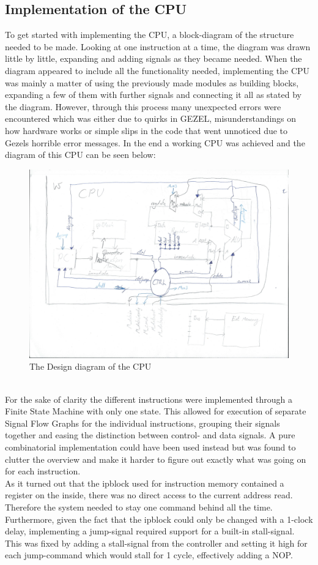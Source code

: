 \documentclass[12pt,a4paper]{article}
\begin{document}
\subsection{Implementation of the CPU}
	To get started with implementing the CPU, a block-diagram of the structure needed to be made. Looking at one instruction at a time, the diagram was drawn little by little, expanding and adding signals as they became needed. When the diagram appeared to include all the functionality needed, implementing the CPU was mainly a matter of using the previously made modules as building blocks, expanding a few of them with further signals and connecting it all as stated by the diagram. However, through this process many unexpected errors were encountered which was either due to quirks in GEZEL, misunderstandings on how hardware works or simple slips in the code that went unnoticed due to Gezels horrible error messages. In the end a working CPU was achieved and the diagram of this CPU can be seen below:\\
	\begin{figure}[h!]
		\centering
			\includegraphics[width=1\textwidth]{Screenshots/Screenshot_DesignDiagram.jpg}
		\caption{The Design diagram of the CPU}
		\label{DesignDiagram}
	\end{figure}
	\\	
	For the sake of clarity the different instructions were implemented through a Finite State Machine with only one state. This allowed for execution of separate Signal Flow Graphs for the individual instructions, grouping their signals together and easing the distinction between control- and data signals. A pure combinatorial implementation could have been used instead but was found to clutter the overview and make it harder to figure out exactly what was going on for each instruction.\\
	As it turned out that the ipblock used for instruction memory contained a register on the inside, there was no direct access to the current address read. Therefore the system needed to stay one command behind all the time. 
	Furthermore, given the fact that the ipblock could only be changed with a 1-clock delay, implementing a jump-signal required support for a built-in stall-signal. This was fixed by adding a stall-signal from the controller and setting it high for each jump-command which would stall for 1 cycle, effectively adding a NOP.
	
\end{document}
